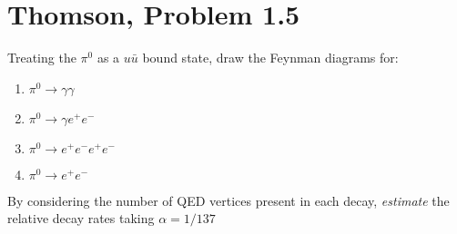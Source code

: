 \documentclass[12pt]{article}
\begin{document}
\section{Thomson, Problem 1.5}
\begin{problem}
  Treating the $\pi^0$ as a $u\bar{u}$ bound state, draw the Feynman diagrams for:
  \begin{enumerate}[label = (\alph*)]
  \item $\pi^0\to\gamma\gamma$
  \item $\pi^0\to\gamma e^+e^-$
  \item $\pi^0\to e^+e^-e^+e^-$
  \item $\pi^0\to e^+e^-$
  \end{enumerate}
  By considering the number of QED vertices present in each decay, \emph{estimate} the relative decay rates taking $\alpha=1/137$
\end{problem}
\end{document}
